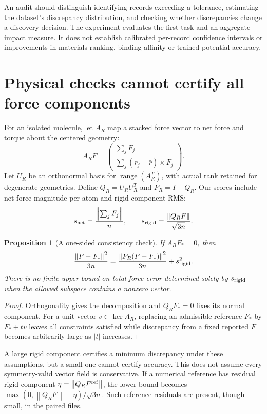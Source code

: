 \documentclass[11pt]{article}
\newtheorem{proposition}{Proposition}
\newcommand{\norm}[1]{\left\lVert #1\right\rVert}
\begin{document}
An audit should distinguish identifying records exceeding a tolerance, estimating
the dataset's discrepancy distribution, and checking whether discrepancies change
a discovery decision. The experiment evaluates the first task and an aggregate
impact measure. It does not establish calibrated per-record confidence intervals
or improvements in materials ranking, binding affinity or trained-potential accuracy.

\section{Physical checks cannot certify all force components}
For an isolated molecule, let $A_R$ map a stacked force vector to net force and
torque about the centered geometry:
\begin{equation}
 A_R F=\begin{pmatrix}\sum_j F_j\\\sum_j(r_j-\bar r)\times F_j\end{pmatrix}.
\end{equation}
Let $U_R$ be an orthonormal basis for $\operatorname{range}(A_R^T)$, with actual
rank retained for degenerate geometries. Define $Q_R=U_RU_R^T$ and $P_R=I-Q_R$.
Our scores include net-force magnitude per atom and rigid-component RMS:
\begin{equation}
 s_{\rm net}=\frac{\norm{\sum_jF_j}}{n},\qquad
 s_{\rm rigid}=\frac{\norm{Q_RF}}{\sqrt{3n}}.
\end{equation}

\begin{proposition}[A one-sided consistency check]
If $A_RF_*=0$, then
\begin{equation}\label{eq:lower}
 \frac{\norm{F-F_*}^2}{3n}=
 \frac{\norm{P_R(F-F_*)}^2}{3n}+s_{\rm rigid}^2.
\end{equation}
There is no finite upper bound on total force error determined solely by
$s_{\rm rigid}$ when the allowed subspace contains a nonzero vector.
\end{proposition}
\begin{proof}
Orthogonality gives the decomposition and $Q_RF_*=0$ fixes its normal component.
For a unit vector $v\in\ker A_R$, replacing an admissible reference $F_*$ by
$F_*+tv$ leaves all constraints satisfied while discrepancy from a fixed
reported $F$ becomes arbitrarily large as $|t|$ increases.
\end{proof}

A large rigid component certifies a minimum discrepancy under these assumptions,
but a small one cannot certify accuracy. This does not assume every symmetry-valid
vector field is conservative. If a numerical reference has residual rigid
component $\eta=\norm{Q_RF^{\rm ref}}$, the lower bound becomes
$\max(0,\norm{Q_RF}-\eta)/\sqrt{3n}$. Such reference residuals are present, though
small, in the paired files.
\end{document}
